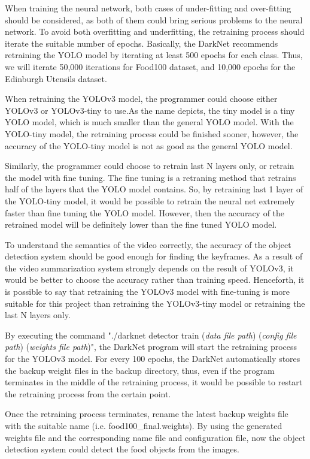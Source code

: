 \documentclass{article}
\begin{document}
When training the neural network, both cases of under-fitting and over-fitting should be considered, as both of them could bring serious problems to the neural network. To avoid both overfitting and underfitting, the retraining process should iterate the suitable number of epochs. Basically, the DarkNet recommends retraining the YOLO model by iterating at least 500 epochs for each class. Thus, we will iterate 50,000 iterations for Food100 dataset, and 10,000 epochs for the Edinburgh Utensils dataset.

When retraining the YOLOv3 model, the programmer could choose either YOLOv3 or YOLOv3-tiny to use.As the name depicts, the tiny model is a tiny YOLO model, which is much smaller than the general YOLO model. With the YOLO-tiny model, the retraining process could be finished sooner, however, the accuracy of the YOLO-tiny model is not as good as the general YOLO model.

Similarly, the programmer could choose to retrain last N layers only, or retrain the model with fine tuning. The fine tuning is a retraning method that retrains half of the layers that the YOLO model contains. So, by retraining last 1 layer of the YOLO-tiny model, it would be possible to retrain the neural net extremely faster than fine tuning the YOLO model. However, then the accuracy of the retrained model will be definitely lower than the fine tuned YOLO model.

To understand the semantics of the video correctly, the accuracy of the object detection system should be good enough for finding the keyframes. As a result of the video summarization system strongly depends on the result of YOLOv3, it would be better to choose the accuracy rather than training speed. Henceforth, it is possible to say that retraining the YOLOv3 model with fine-tuning is more suitable for this project than retraining the YOLOv3-tiny model or retraining the last N layers only.

By executing the command "./darknet detector train (\textit{data file path}) (\textit{config file path}) (\textit{weights file path})", the DarkNet program will start the retraining process for the YOLOv3 model. For every 100 epochs, the DarkNet automatically stores the backup weight files in the backup directory, thus, even if the program terminates in the middle of the retraining process, it would be possible to restart the retraining process from the certain point.

Once the retraining process terminates, rename the latest backup weights file with the suitable name (i.e. food100\_final.weights). By using the generated weights file and the corresponding name file and configuration file, now the object detection system could detect the food objects from the images.
\end{document}
